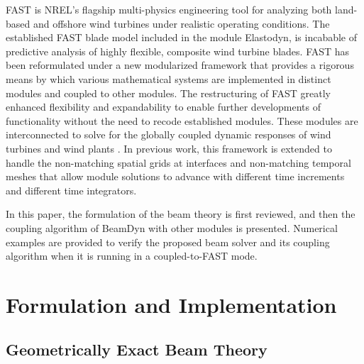 \documentclass{aiaa-tc}
\begin{document}
FAST is NREL's flagship multi-physics engineering tool for analyzing both land-based and offshore wind turbines under realistic operating conditions.  
The established FAST blade model included in the module Elastodyn, is incabable 
of predictive analysis of highly flexible, composite wind turbine blades. 
FAST has been reformulated under a new modularized framework that provides a rigorous means by which various mathematical systems are implemented in distinct modules and coupled to other modules. 
The restructuring of FAST greatly enhanced flexibility and expandability to enable further developments of functionality without the need to recode established modules. 
These modules are interconnected to solve for the globally coupled dynamic responses of wind turbines and wind plants \cite{Jonkman:2013,website:FASTModularizationFramework}. In previous work, this framework is extended to handle the non-matching spatial grids at interfaces and non-matching temporal meshes that allow module solutions to advance with different time increments and different time integrators.\cite{Sprague:2014}

In this paper, the formulation of the beam theory is first reviewed, and then the coupling algorithm of BeamDyn with other modules is presented. 
Numerical examples are provided to verify the proposed beam solver and its coupling algorithm when it is running in a coupled-to-FAST mode.

\section{Formulation and Implementation}

\subsection{Geometrically Exact Beam Theory}
\end{document}
